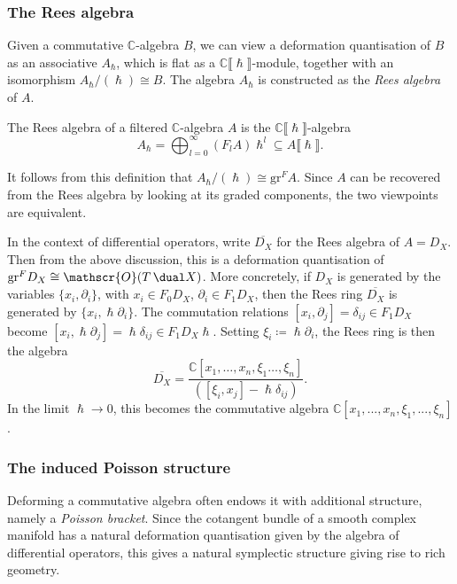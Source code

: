 \subsubsection{The Rees algebra} 
Given a commutative $\mathbb{C}$-algebra $B$, we can view a
deformation quantisation of $B$ as an associative $A_{\hslash}$, which
is flat as a $\mathbb{C}\llbracket \hslash\rrbracket$-module, together with an
isomorphism $A_\hslash/(\hslash) \cong B$. The algebra \(A_\hslash\) is
constructed as the \emph{Rees algebra} of \(A\). 

\begin{definition}
    The Rees algebra of a filtered $\mathbb{C}$-algebra $A$ is the
    $\mathbb{C}\llbracket \hslash\rrbracket$-algebra 
    \begin{equation*} 
        A_\hslash = \bigoplus_{l=0}^\infty (F_l A) \hslash^l \subseteq
        A\llbracket\hslash\rrbracket.  
    \end{equation*} 
\end{definition}
It follows from this definition that $A_{\hslash}/(\hslash) \cong \text{gr}^F
A$. Since \(A\) can be recovered from the Rees algebra by looking at its graded
components, the two viewpoints are equivalent. 

In the context of differential operators, write  \(\overline{D_X}\) for the Rees
algebra of \(A=D_X\). Then from the above discussion, this is a deformation
quantisation of $\text{gr}^F D_X\cong \mathscr{O}(T\,\dual X)$. More concretely,
if $D_X$ is generated by the variables $\{x_i, \partial_i\}$, with $x_i \in F_0
D_X$, $\partial_i \in F_1 D_X$, then the Rees ring $\overline{D_X}$ is generated
by $\{x_i, \hslash\partial_i\}$. The commutation relations $[x_i,
\partial_j]=\delta_{ij} \in F_1 D_X$ become $[x_i,
\hslash\partial_j]=\hslash\delta_{ij} \in F_1 D_X \hslash$. Setting
$\xi_i\coloneqq \hslash \partial_i$, the Rees ring is then the
algebra
\begin{equation*}
    \overline{D_X} = \frac{\mathbb{C}[x_1,\dots,x_n, \xi_1\dots,
    \xi_n]}{([\xi_i, x_j] -\hslash\delta_{ij})}.
\end{equation*}
In the limit \(\hslash \rightarrow 0\), this becomes the commutative algebra
\(\mathbb{C}[x_1,...,x_n,\xi_1,...,\xi_n]\).

\subsubsection{The induced Poisson structure}
Deforming a commutative algebra often endows it with additional
structure, namely a \emph{Poisson bracket}. Since the cotangent bundle
of a smooth complex manifold has a natural deformation quantisation given by the
algebra of differential operators, this gives a natural symplectic
structure giving rise to rich geometry.

